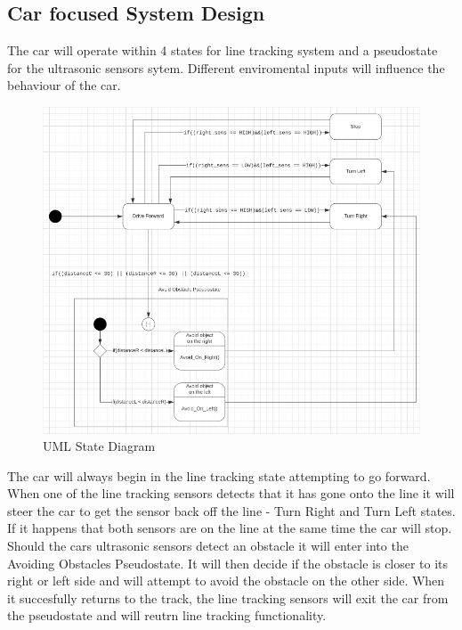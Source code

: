 \documentclass[conference]{IEEEtran}
\begin{document}
\subsection{Car focused System Design}
The car will operate within 4 states for line tracking system and a pseudostate for the ultrasonic sensors sytem. Different enviromental inputs will influence the behaviour of the car.
\begin{figure}[h!]
	\includegraphics[width=\linewidth]{UMLStateDiagram.png}
	\caption{UML State Diagram}
	\label{fig:UMLSD1}
\end{figure}
The car will always begin in the line tracking state attempting to go forward. When one of the line tracking sensors detects that it has gone onto the line it will steer the car to get the sensor back off the line - Turn Right and Turn Left states. If it happens that both sensors are on the line at the same time the car will stop. Should the cars ultrasonic sensors detect an obstacle it will enter into the Avoiding Obstacles Pseudostate. It will then decide if the obstacle is closer to its right or left side and will attempt to avoid the obstacle on the other side. When it succesfully returns to the track, the line tracking sensors will exit the car from the pseudostate and will reutrn line tracking functionality.
\end{document}
